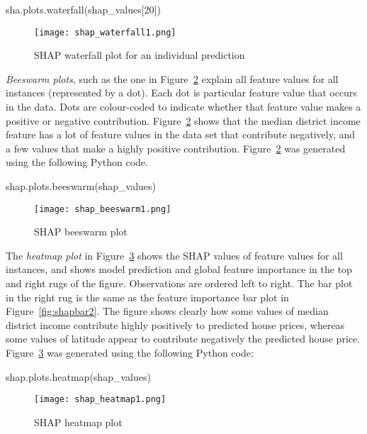 \begin{pythoncode}
sha.plots.waterfall(shap_values[20])
\end{pythoncode}

\begin{figure}
\centering

\texttt{[image: shap\_waterfall1.png]}
\caption{SHAP waterfall plot for an individual prediction}
\label{fig:shapwaterfall}
\end{figure}


\emph{Beeswarm plots}, such as the one in Figure~\ref{fig:shapbeeswarm} explain all feature values for all instances (represented by a dot). Each dot is particular feature value that occurs in the data. Dots are colour-coded to indicate whether that feature value makes a positive or negative contribution. Figure~\ref{fig:shapbeeswarm} shows that the median district income feature has a lot of feature values in the data set that contribute negatively, and a few values that make a highly positive contribution. Figure~\ref{fig:shapbeeswarm} was generated using the following Python code.

\begin{pythoncode}
shap.plots.beeswarm(shap_values)
\end{pythoncode}

\begin{figure}
\centering

\texttt{[image: shap\_beeswarm1.png]}
\caption{SHAP beeswarm plot}
\label{fig:shapbeeswarm}
\end{figure}


The \emph{heatmap plot} in Figure~\ref{fig:shapheatmap} shows the SHAP values of feature values for all instances, and shows model prediction and global feature importance in the top and right rugs of the figure. Observations are ordered left to right. The bar plot in the right rug is the same as the feature importance bar plot in Figure~\ref{fig:shapbar2}. The figure shows clearly how some values of median district income contribute highly positively to predicted house prices, whereas some values of latitude appear to contribute negatively the predicted house price. Figure~\ref{fig:shapheatmap} was generated using the following Python code:

\begin{pythoncode}
shap.plots.heatmap(shap_values)
\end{pythoncode}

\begin{figure}
\centering

\texttt{[image: shap\_heatmap1.png]}
\caption{SHAP heatmap plot}
\label{fig:shapheatmap}
\end{figure}

